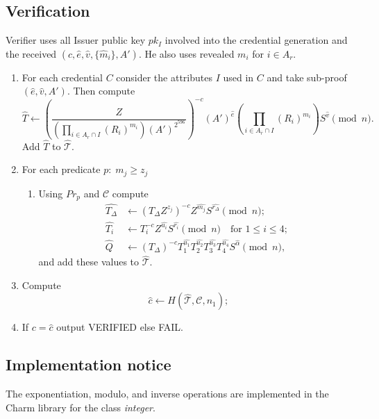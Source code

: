 \documentclass[a4paper]{article}
\begin{document}
\subsection{Verification}
Verifier uses all Issuer public key $pk_I$ involved into the credential generation and  the received $(c,\widehat{e},\widehat{v},\{\widehat{m}_i\},A')$. He also uses revealed 
$m_i$ for $i\in A_r$.

\begin{enumerate}
\item For each credential $C$ consider the  attributes $I$ used in $C$ and take sub-proof $(\widehat{e},\widehat{v},A')$. Then compute 
\begin{equation}\label{eq:that}
 \widehat{T} \leftarrow \left(
    \frac{Z}
    { \left(
        \prod_{i \in A_r\cap I}(R_i)^{m_i}
    \right)
    (A')^{2^{596}}
    }\right)^{-c}
    (A')^{\widehat{e}}
    \left(\prod_{i\in A_{\overline{r}}\cap I}(R_i)^{\widehat{m_i}}\right)
    S^{\widehat{v}}\pmod{n}.
\end{equation}
Add $\widehat{T}$ to $\widehat{\mathcal{T}}$.
\item For each predicate $p:\;m_j\geq z_j$
\begin{enumerate}
\item Using $Pr_p$ and $\mathcal{C}$ compute 
\begin{align}
\widehat{T_{\Delta}} &\leftarrow \left(T_{\Delta}Z^{z_j}\right)^{-c}Z^{\widehat{m_j}}S^{\widehat{r_{\Delta}}}\pmod{n};\label{eq:pr1}\\
\widehat{T_i} &\leftarrow T_i^{-c}Z^{\widehat{u_i}} S^{\widehat{r_i}}\pmod{n} \quad \text{for }1\leq i \leq 4;\label{eq:pr2}\\
\widehat{Q}&\leftarrow (T_{\Delta})^{-c}T_1^{\widehat{u_1}}T_2^{\widehat{u_2}}T_3^{\widehat{u_3}}T_4^{\widehat{u_4}}
S^{\widehat{\alpha}}\pmod{n}\label{eq:pr3},
\end{align}
and add these values to  $\widehat{\mathcal{T}}$.
\end{enumerate}
\item Compute $$
\widehat{c} \leftarrow H(\widehat{\mathcal{T}},\mathcal{C},n_1);
$$
\item If $c=\widehat{c}$ output VERIFIED else FAIL.
\end{enumerate}

\subsection{Implementation notice}
The exponentiation, modulo, and inverse operations are implemented in the Charm library for the class \textsl{integer}.
\end{document}

